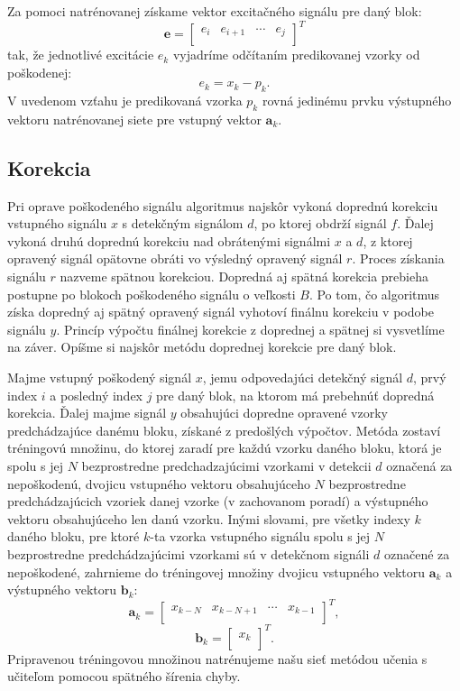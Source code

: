 Za pomoci natrénovanej získame vektor excitačného signálu pre daný blok:
$$\mathbf{e}=\begin{bmatrix} 
  e_i & e_{i+1} & \cdots & e_{j}\\
\end{bmatrix}^T$$ 
tak, že jednotlivé excitácie $e_k$ vyjadríme odčítaním predikovanej vzorky od poškodenej:
$$e_k = x_k - p_k.$$ 
V uvedenom vzťahu je predikovaná vzorka $p_k$ rovná jedinému prvku výstupného vektoru natrénovanej siete pre vstupný vektor $\mathbf{a}_k$.

\subsection{Korekcia}
Pri oprave poškodeného signálu algoritmus najskôr vykoná doprednú korekciu vstupného signálu $x$ s detekčným signálom $d$, po ktorej obdrží signál $f$. Ďalej vykoná druhú doprednú korekciu nad obrátenými signálmi $x$ a $d$, z ktorej opravený signál opätovne obráti vo výsledný opravený signál $r$. Proces získania signálu $r$ nazveme spätnou korekciou. Dopredná aj spätná korekcia prebieha postupne po blokoch poškodeného signálu o veľkosti $B$. Po tom, čo algoritmus získa dopredný aj spätný opravený signál vyhotoví finálnu korekciu v podobe signálu $y$. Princíp výpočtu finálnej korekcie z doprednej a spätnej si vysvetlíme na záver. Opíšme si najskôr metódu doprednej korekcie pre daný blok.

Majme vstupný poškodený signál $x$, jemu odpovedajúci detekčný signál $d$, prvý index $i$ a posledný index $j$ pre daný blok, na ktorom má prebehnúť dopredná korekcia. Ďalej majme signál $y$ obsahujúci dopredne opravené vzorky predchádzajúce danému bloku, získané z predošlých výpočtov. Metóda zostaví tréningovú množinu, do ktorej zaradí pre každú vzorku daného bloku, ktorá je spolu s jej $N$ bezprostredne predchadzajúcimi vzorkami v detekcii $d$ označená za nepoškodenú, dvojicu vstupného vektoru obsahujúceho $N$ bezprostredne predchádzajúcich vzoriek danej vzorke (v zachovanom poradí) a výstupného vektoru obsahujúceho len danú vzorku. Inými slovami, pre všetky indexy $k$ daného bloku, pre ktoré $k$-ta vzorka vstupného signálu spolu s jej $N$ bezprostredne predchádzajúcimi vzorkami sú v detekčnom signáli $d$ označené za nepoškodené, zahrnieme do tréningovej množiny dvojicu vstupného vektoru $\mathbf{a}_k$ a výstupného vektoru $\mathbf{b}_k$:
$$\mathbf{a}_k=\begin{bmatrix} 
x_{k-N} & x_{k-N+1} & \cdots & x_{k-1}\\ 
\end{bmatrix}^T,$$
$$\mathbf{b}_k=\begin{bmatrix} 
x_k\\ 
\end{bmatrix}^T.$$
Pripravenou tréningovou množinou natrénujeme našu sieť metódou učenia s učiteľom pomocou spätného šírenia chyby. 

